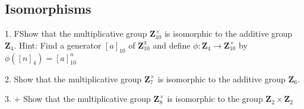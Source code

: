 \subsection{Isomorphisms}
\begin{mdframed}[style=darkQuesion]
  1. FShow that the multiplicative group $\mathbf{Z}_{10}^{\times}$ is isomorphic to the additive group $\mathbf{Z}_{4}$. Hint: Find a generator $[a]_{10}$ of $\mathbf{Z}_{10}^{\mathrm{x}}$ and define $\phi: \mathbf{Z}_{4} \rightarrow \mathbf{Z}_{10}^{\times}$ by $\phi\left([n]_{4}\right)=[a]_{10}^{n}$
\end{mdframed}
\begin{mdframed}[style=darkAnswer,frametitle={Joe Starr}]
  
\end{mdframed}
\newpage
\begin{mdframed}[style=darkQuesion]
  2. Show that the multiplicative group $\mathbf{Z}_{7}^{\times}$ is isomorphic to the additive group $\mathbf{Z}_{6}$.
\end{mdframed}
\begin{mdframed}[style=darkAnswer,frametitle={Joe Starr}]
  
\end{mdframed}
\newpage
\begin{mdframed}[style=darkQuesion]
  3. $+$ Show that the multiplicative group $\mathbf{Z}_{8}^{\times}$ is isomorphic to the group $\mathbf{Z}_{2} \times \mathbf{Z}_{2}$
\end{mdframed}
